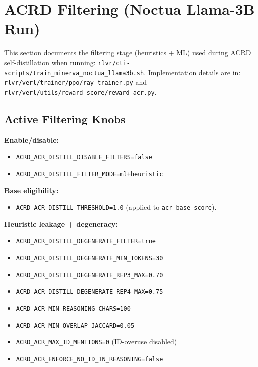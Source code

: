 \section{ACRD Filtering (Noctua Llama-3B Run)}
\label{sec:acrd-filtering-noctua}

This section documents the filtering stage (heuristics + ML) used during
ACRD self-distillation when running:
\texttt{rlvr/cti-scripts/train\_minerva\_noctua\_llama3b.sh}.
Implementation details are in:
\texttt{rlvr/verl/trainer/ppo/ray\_trainer.py} and
\texttt{rlvr/verl/utils/reward\_score/reward\_acr.py}.

\subsection{Active Filtering Knobs}
\label{subsec:acrd-filtering-knobs}

\textbf{Enable/disable:}
\begin{itemize}
  \item \texttt{ACRD\_ACR\_DISTILL\_DISABLE\_FILTERS=false}
  \item \texttt{ACRD\_ACR\_DISTILL\_FILTER\_MODE=ml+heuristic}
\end{itemize}

\textbf{Base eligibility:}
\begin{itemize}
  \item \texttt{ACRD\_ACR\_DISTILL\_THRESHOLD=1.0} (applied to
        \texttt{acr\_base\_score}).
\end{itemize}

\textbf{Heuristic leakage + degeneracy:}
\begin{itemize}
  \item \texttt{ACRD\_ACR\_DISTILL\_DEGENERATE\_FILTER=true}
  \item \texttt{ACRD\_ACR\_DISTILL\_DEGENERATE\_MIN\_TOKENS=30}
  \item \texttt{ACRD\_ACR\_DISTILL\_DEGENERATE\_REP3\_MAX=0.70}
  \item \texttt{ACRD\_ACR\_DISTILL\_DEGENERATE\_REP4\_MAX=0.75}
  \item \texttt{ACRD\_ACR\_MIN\_REASONING\_CHARS=100}
  \item \texttt{ACRD\_ACR\_MIN\_OVERLAP\_JACCARD=0.05}
  \item \texttt{ACRD\_ACR\_MAX\_ID\_MENTIONS=0} (ID-overuse disabled)
  \item \texttt{ACRD\_ACR\_ENFORCE\_NO\_ID\_IN\_REASONING=false}
\end{itemize}

